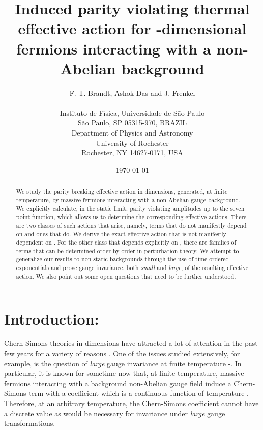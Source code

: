 \documentclass[a4paper,12pt]{article}
\begin{document}
\title{Induced parity violating thermal effective action for
\coordHE{}-dimensional fermions interacting with a non-Abelian background}

\author{F. T. Brandt\coordHE{}, Ashok Das\coordHE{} and J. Frenkel\coordHE{}
\\ \\
\coordHE{}Instituto de F\'{\i}sica,
Universidade de S\~ao Paulo\\
S\~ao Paulo, SP 05315-970, BRAZIL\\
\coordHE{}Department of Physics and Astronomy\\
University of Rochester\\
Rochester, NY 14627-0171, USA}
\date{\today}
\maketitle

\begin{abstract}
We study the parity breaking effective action in \coordHE{} dimensions,
generated, at finite temperature, by massive fermions interacting with
a non-Abelian gauge background. We explicitly calculate, in the static
limit, parity violating amplitudes up to the seven point
function, which allows us to determine the corresponding effective
actions. There are two classes of such actions that arise, namely,
terms that do not manifestly depend on \coordHE{} and ones that do. We
derive the exact effective action that is not manifestly dependent on
\coordHE{}. For the other class that depends explicitly on
\coordHE{},  there are families of terms that
can be determined order by order in perturbation theory. We attempt to
generalize
our results to non-static backgrounds through the use of time ordered
exponentials and prove gauge invariance, both {\it small} and {\it
  large}, of the resulting effective action. We also point out some open
questions that need to be further understood.
\end{abstract}
\newpage
\section{Introduction:}
Chern-Simons theories in \coordHE{} dimensions
\cite{chern:1974,Deser:1982wh} have  attracted a lot of
attention  in the past few years for a variety of reasons 
\cite{dunne:leshouches}.
One of the issues  studied extensively, for example, is the question
of  {\it  large}  gauge invariance at finite temperature
\cite{babu:1987rs}-\cite{cdfosco}.
In particular, it is known for sometime now that, at
finite temperature, massive fermions interacting with a background
non-Abelian gauge field induce a Chern-Simons term with a coefficient
which is a continuous function of temperature \cite{babu:1987rs}.
Therefore, at an
arbitrary temperature, the Chern-Simons coefficient cannot have a
discrete value as would be necessary for invariance under {\it large}
gauge transformations.
\end{document}
